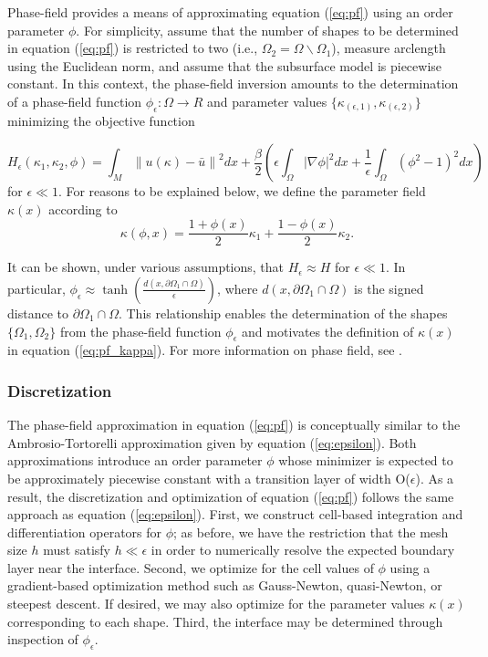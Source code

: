 \documentclass[manuscript,revised]{geophysics}
\newcommand\norm[1]{\left\lVert#1\right\rVert}
\begin{document}
Phase-field provides a means of approximating equation (\ref{eq:pf}) using an order parameter $\phi$.  For simplicity, assume that the number of shapes to be determined in equation (\ref{eq:pf}) is restricted to two (i.e., $\Omega_2=\Omega\backslash\Omega_1$), measure arclength using the Euclidean norm, and assume that the subsurface model is piecewise constant.  In this context, the phase-field inversion amounts to the determination of a phase-field function $\phi_\epsilon:\Omega \rightarrow R$ and parameter values $\{ \kappa_{(\epsilon,1)}, \kappa_{(\epsilon,2)} \}$ minimizing the objective function 

\begin{equation} \label{eq:pf_epsilon}
H_\epsilon \left( \kappa_1,\kappa_2,\phi \right)=\int_M \norm{u(\kappa)-\bar{u}}^2  dx +\frac{\beta}{2} \left( \epsilon \int_\Omega \left\vert \nabla \phi \right\vert^2 dx+\frac{1}{\epsilon} \int_\Omega  \left( \phi^2-1 \right)^2 dx \right)
\end{equation}
for $\epsilon \ll 1$.  For reasons to be explained below, we define the parameter field $\kappa(x)$ according to
\begin{equation} \label{eq:pf_kappa}
\kappa(\phi,x) = \frac{1+\phi(x)}{2} \kappa_1 + \frac{1-\phi(x)}{2} \kappa_2.
\end{equation}

It can be shown, under various assumptions, that $H_\epsilon \approx H$ for $\epsilon \ll 1$.  In particular, $\phi_\epsilon \approx \tanh{\left(  \frac{d \left( x, \partial\Omega_1 \cap \Omega \right)}{\epsilon}   \right) }$, where $d(x,\partial\Omega_1 \cap \Omega )$ is the signed distance to $\partial\Omega_1 \cap \Omega$. This relationship enables the determination of the shapes $\{\Omega_1, \Omega_2 \}$ from the phase-field function $\phi_\epsilon$ and motivates the definition of $\kappa(x)$ in equation (\ref{eq:pf_kappa}).  For more information on phase field, see  \cite{Deckelnick_2005}.


\subsubsection{Discretization}

The phase-field approximation in equation (\ref{eq:pf}) is conceptually similar to the Ambrosio-Tortorelli approximation given by equation (\ref{eq:epsilon}).  Both approximations introduce an order parameter $\phi$ whose minimizer is expected to be approximately piecewise constant with a transition layer of width  O($\epsilon$).  As a result, the discretization and optimization of equation (\ref{eq:pf}) follows the same approach as equation (\ref{eq:epsilon}).  First, we construct cell-based integration and differentiation operators for $\phi$; as before, we have the restriction that the mesh size $h$  must satisfy $h \ll \epsilon$ in order to numerically resolve the expected boundary layer near the interface. Second, we optimize for the cell values of $\phi$ using a gradient-based optimization method such as Gauss-Newton, quasi-Newton, or steepest descent.  If desired, we may also optimize for the parameter values $\kappa(x)$ corresponding to each shape.  Third, the interface may be determined through inspection of $\phi_\epsilon$.
\end{document}
